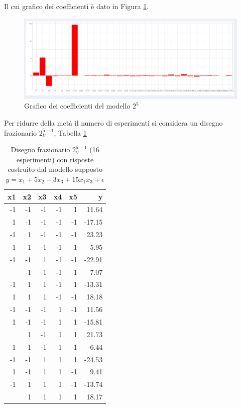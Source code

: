 \documentclass[
  11pt,
]{book}
\begin{document}
Il cui grafico dei coefficienti è dato in Figura \ref{fig:fz11}.

\begin{figure}[ht]

{\centering \includegraphics[width=1\linewidth]{Immagini/Fraz/11_Conf_full2} 

}

\caption{Grafico dei coefficienti del modello $2^5$ }\label{fig:fz11}
\end{figure}

Per ridurre della metà il numero di esperimenti si considera un disegno frazionario \(2^{5-1}_V\), Tabella \ref{tab:Confris5}
\newpage

\begin{table}

\caption{\label{tab:Confris5}Disegno frazionario $2^{5-1}_V$ (16 esperimenti) con risposte costruito dal modello supposto $y=x_1+5x_2-3x_3+15x_1x_3+\epsilon$}
\centering
\begin{tabular}[t]{rrrrrr}
\toprule
x1 & x2 & x3 & x4 & x5 & y\\
\midrule
-1 & -1 & -1 & -1 & 1 & 11.64\\
1 & -1 & -1 & -1 & -1 & -17.15\\
-1 & 1 & -1 & -1 & -1 & 23.23\\
1 & 1 & -1 & -1 & 1 & -5.95\\
-1 & -1 & 1 & -1 & -1 & -22.91\\
\addlinespace
1 & -1 & 1 & -1 & 1 & 7.07\\
-1 & 1 & 1 & -1 & 1 & -13.31\\
1 & 1 & 1 & -1 & -1 & 18.18\\
-1 & -1 & -1 & 1 & -1 & 11.56\\
1 & -1 & -1 & 1 & 1 & -15.81\\
\addlinespace
-1 & 1 & -1 & 1 & 1 & 21.73\\
1 & 1 & -1 & 1 & -1 & -6.44\\
-1 & -1 & 1 & 1 & 1 & -24.53\\
1 & -1 & 1 & 1 & -1 & 9.41\\
-1 & 1 & 1 & 1 & -1 & -13.74\\
\addlinespace
1 & 1 & 1 & 1 & 1 & 18.17\\
\bottomrule
\end{tabular}
\end{table}
\end{document}
